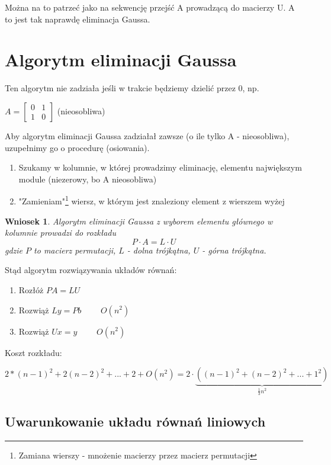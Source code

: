 \documentclass[hidelinks,a4paper,fleqn,oneside]{book}
\newtheorem{wniosek}{Wniosek}
\begin{document}
Można na to patrzeć jako na sekwencję przejść A prowadzącą do macierzy U. A to jest tak naprawdę eliminacja Gaussa.

\section{Algorytm eliminacji Gaussa}
Ten algorytm nie zadziała jeśli w trakcie będziemy dzielić przez 0, np.

$A = \left[
	\begin{array}{cc}
		0 & 1 \\
		1 & 0 
\end{array}\right]$ (nieosobliwa)
    
Aby algorytm eliminacji Gaussa zadziałał zawsze (o ile tylko A - nieosobliwa), uzupełnimy go o procedurę  (osiowania). 

\begin{enumerate}
	\item Szukamy w kolumnie, w której prowadzimy eliminację, elementu  największym module (niezerowy, bo A nieosobliwa)
	\item "Zamieniam"\footnote{Zamiana wierszy - mnożenie macierzy przez macierz permutacji} wiersz, w którym jest znaleziony element z wierszem wyżej 
\end{enumerate}


\begin{wniosek} Algorytm eliminacji Gaussa z wyborem elementu głównego w kolumnie prowadzi do rozkładu
	\[
		P \cdot A = L \cdot U
	\]
	gdzie $P$ to macierz permutacji, $L$ - dolna trójkątna, $U$ - górna trójkątna.
	
\end{wniosek}

Stąd algorytm rozwiązywania układów równań:

\begin{enumerate}
	\item Rozłóż $PA = LU$
	\item Rozwiąż $Ly= Pb$ $\quad\quad O(n^2)$
	\item Rozwiąż $Ux = y$ $\quad\quad O(n^2)$
\end{enumerate}

Koszt rozkładu:

$2*(n-1)^2 + 2(n-2)^2 + ... + 2 + O(n^2) = 2 \cdot \underbrace{((n-1)^2 + (n-2)^2 + ... + 1^2)}_{\frac{1}{3}n^2}$

\subsection{Uwarunkowanie układu równań liniowych}
\end{document}
